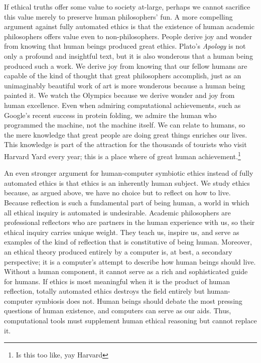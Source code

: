 \begin{isabellebody}
\begin{isamarkuptext}
If ethical truths offer some value to society at-large, perhaps we cannot sacrifice this value merely 
to preserve human philosophers’ fun. A more compelling argument against fully automated 
ethics is that the existence of human academic philosophers offers value even to non-philosophers. 
People derive joy and wonder from knowing that human beings produced great ethics. Plato’s \emph{Apology} 
is not only a profound and insightful text, but it is also wonderous that a human being produced such 
a work. We derive joy from knowing that our fellow humans are capable of the kind of thought that 
great philosophers accomplish, just as an unimaginably beautiful work of art is more wonderous 
because a human being painted it. We watch the Olympics because we derive wonder and joy from human 
excellence. Even when admiring computational achievements, such as Google’s recent success in protein 
folding, we admire the human who programmed the machine, not the machine itself. We can relate to 
humans, so the mere knowledge that great people are doing great things enriches our lives. This 
knowledge is part of the attraction for the thousands of tourists who visit Harvard Yard every year; 
this is a place where of great human achievement.\footnote{Is this too like, yay Harvard}

An even stronger argument for human-computer symbiotic ethics instead of fully automated ethics is 
that ethics is an inherently human subject. We study ethics because, as argued above, we 
have no choice but to reflect on how to live. Because reflection is such a fundamental part of being 
human, a world in which all ethical inquiry is automated is undesirable. Academic philosophers are 
professional reflectors who are partners in the human experience with us, so their ethical inquiry 
carries unique weight. They teach us, inspire us, and serve as examples of the kind of reflection 
that is constitutive of being human. Moreover, an ethical theory produced entirely by a computer is, 
at best, a secondary perspective; it is a computer’s attempt to describe how human beings should live. 
Without a human component, it cannot serve as a rich and sophisticated guide for humans. If ethics is 
most meaningful when it is the product of human reflection, totally automated ethics destroys the field 
entirely but human-computer symbiosis does not. Human beings should debate the most pressing questions 
of human existence, and computers can serve as our aids. Thus, computational tools must supplement 
human ethical reasoning but cannot replace it.%
\end{isamarkuptext}\isamarkuptrue%
%
\isadelimtheory
%
\endisadelimtheory
%
\isatagtheory
{}\isamarkupfalse%
%
\endisatagtheory
{\isafoldtheory}%
%
\isadelimtheory
%
\endisadelimtheory
%
\end{isabellebody}%
